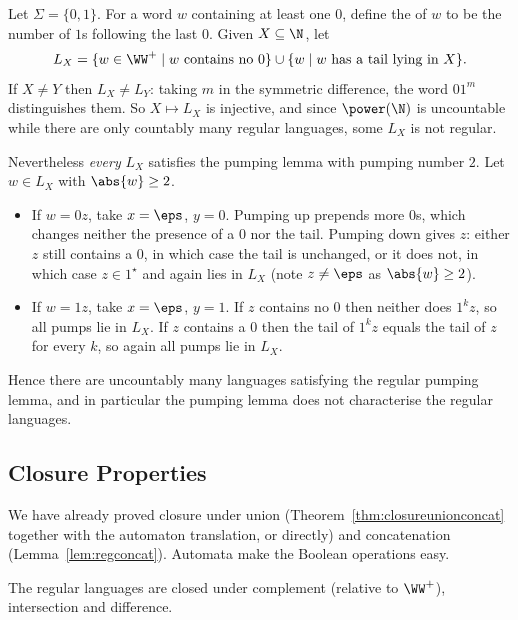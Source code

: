\begin{example}\label{ex:pumpingnotsufficient}
	Let $\Sigma = \{0,1\}$. For a word $w$ containing at least one $0$, define the  of $w$ to be the number of $1$s following the last $0$. Given $X \subseteq \N$, let
	$$L_X = \{w \in \WW^+ \mid w \text{ contains no } 0\} \cup \{w \mid w \text{ has a tail lying in } X\}.$$
	If $X \neq Y$ then $L_X \neq L_Y$: taking $m$ in the symmetric difference, the word $01^m$ distinguishes them. So $X \mapsto L_X$ is injective, and since $\power(\N)$ is uncountable while there are only countably many regular languages, some $L_X$ is not regular.

	Nevertheless \emph{every} $L_X$ satisfies the pumping lemma with pumping number $2$. Let $w \in L_X$ with $\abs{w} \geq 2$.
	\begin{itemize}
		\item If $w = 0z$, take $x = \eps$, $y = 0$. Pumping up prepends more $0$s, which changes neither the presence of a $0$ nor the tail. Pumping down gives $z$: either $z$ still contains a $0$, in which case the tail is unchanged, or it does not, in which case $z \in 1^\star$ and again lies in $L_X$ (note $z \neq \eps$ as $\abs{w} \geq 2$).
		\item If $w = 1z$, take $x = \eps$, $y = 1$. If $z$ contains no $0$ then neither does $1^kz$, so all pumps lie in $L_X$. If $z$ contains a $0$ then the tail of $1^kz$ equals the tail of $z$ for every $k$, so again all pumps lie in $L_X$.
	\end{itemize}
	Hence there are uncountably many languages satisfying the regular pumping lemma, and in particular the pumping lemma does not characterise the regular languages.
\end{example}

\subsection{Closure Properties}

We have already proved closure under union (Theorem~\ref{thm:closureunionconcat} together with the automaton translation, or directly) and concatenation (Lemma~\ref{lem:regconcat}). Automata make the Boolean operations easy.

\begin{proposition}\label{prop:regcomplement}
	The regular languages are closed under complement (relative to $\WW^+$), intersection and difference.
\end{proposition}


